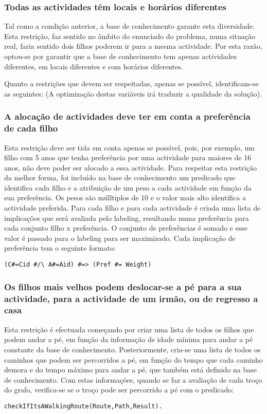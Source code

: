 \documentclass[runningheads]{llncs}
\begin{document}
\subsubsection{Todas as actividades têm locais e horários diferentes} Tal como a condição anterior, a base de conhecimento garante esta diversidade. Esta restrição, faz sentido no âmbito do enunciado do problema, numa situação real, faria sentido dois filhos poderem ir para a mesma actividade. Por esta razão, optou-se por garantir que a base de conhecimento tem apenas actividades diferentes, em locais diferentes e com horários diferentes.

Quanto a restrições que devem ser respeitadas, apenas se possível, identificam-se as seguintes: (A optimização destas variáveis irá traduzir a qualidade da solução).

\subsubsection{A alocação de actividades deve ter em conta a preferência de cada filho} Esta restrição deve ser tida em conta apenas se possível, pois, por exemplo, um filho com 5 anos que tenha preferência por uma actividade para maiores de 16 anos, não deve poder ser alocado a essa actividade.
Para respeitar esta restrição da melhor forma, foi incluído na base de conhecimento um predicado que identifica cada filho e a atribuição de um peso a cada actividade em função da sua preferência. Os pesos são múlltiplos de 10 e o valor mais alto identifica a actividade preferida. Para cada filho e para cada actividade é criada uma lista de implicações que será avaliada pelo labeling, resultando numa preferência para cada conjunto filho x preferência. O conjunto de preferências é somado e esse valor é passado para o labeling para ser maximizado.
Cada implicação de preferência tem o seguinte formato:
\begin{lstlisting}
(C#=Cid #/\ A#=Aid) #=> (Pref #= Weight)
\end{lstlisting}

\subsubsection{Os filhos mais velhos podem deslocar-se a pé para a sua actividade, para a actividade de um irmão, ou de regresso a casa} Esta restrição é efectuada começando por criar uma lista de todos os filhos que podem andar a pé, em função da informação de idade mínima para andar a pé constante da base de conhecimento. Posteriormente, cria-se uma lista de todos os caminhos que podem ser percorridos a pé, em função do tempo que cada caminho demora e do tempo máximo para andar a pé, que também está definido na base de conhecimento.
Com estas informações, quando se faz a avaliação de cada troço do grafo, verifica-se se o troço pode ser percorrido a pé com o predicado:
\begin{lstlisting}
checkIfItsAWalkingRoute(Route,Path,Result).
\end{lstlisting}
\end{document}
